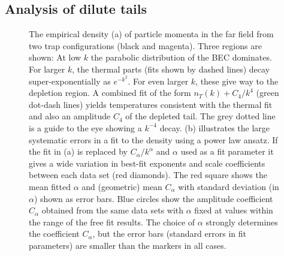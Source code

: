 	


\subsection{Analysis of dilute tails} 
\label{sec:analysis}

  \begin{figure}[p]%
    \begin{leftfullpage}
	        \caption{The empirical density (a) of particle momenta in the far field from two trap configurations (black and magenta). Three regions are shown: At low $k$ the parabolic distribution of the BEC dominates. For larger $k$, the thermal parts (fits shown by dashed lines) decay super-exponentially as $e^{-k^2}$. For even larger $k$, these give way to the depletion region. A combined fit of the form $n_T(k) + C_4/k^4$ (green dot-dash lines) yields temperatures consistent with the thermal fit and also an amplitude $C_4$ of the depleted tail. The grey dotted line is a guide to the eye showing a $k^{-4}$ decay.
	        (b) illustrates the large systematic errors in a fit to the density using a power law ansatz. If the fit in (a) is replaced by $C_\alpha/k^\alpha$ and $\alpha$ used as a fit parameter it gives a wide variation in best-fit exponents and scale coefficients between each data set (red diamonds). The red square shows the mean fitted $\alpha$ and (geometric) mean $C_\alpha$ with standard deviation (in $\alpha$) shown as error bars. Blue circles show the amplitude coefficient $C_\alpha$ obtained from the same data sets with $\alpha$ fixed at values within the range of the free fit results. The choice of $\alpha$ strongly determines the coefficient $C_\alpha$, but the error bars (standard errors in fit parameters) are smaller than the markers in all cases. }
	        \label{fig:contact_determination_issues}
    \end{leftfullpage}
  \end{figure}
